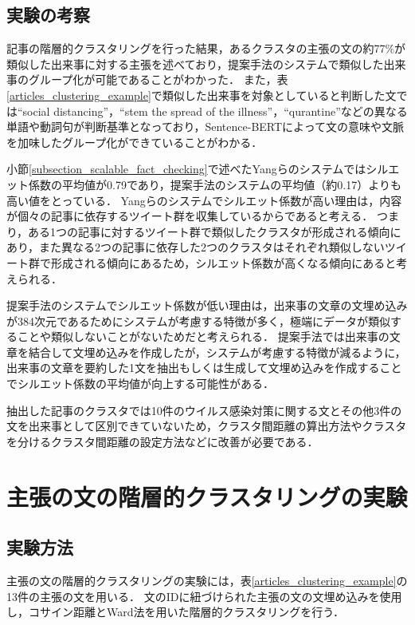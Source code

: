 \documentclass[12pt,a4j]{jreport}
\begin{document}
\subsection{実験の考察}
記事の階層的クラスタリングを行った結果，あるクラスタの主張の文の約77\%が類似した出来事に対する主張を述べており，提案手法のシステムで類似した出来事のグループ化が可能であることがわかった．
また，表\ref{articles_clustering_example}で類似した出来事を対象としていると判断した文では``social distancing''，``stem the spread of the illness''，``qurantine''などの異なる単語や動詞句が判断基準となっており，Sentence-BERTによって文の意味や文脈を加味したグループ化ができていることがわかる．

小節\ref{subsection_scalable_fact_checking}で述べたYangらのシステムではシルエット係数の平均値が0.79であり，提案手法のシステムの平均値（約0.17）よりも高い値をとっている\cite{yang_scalable_2021}．
Yangらのシステムでシルエット係数が高い理由は，内容が個々の記事に依存するツイート群を収集しているからであると考える．
つまり，ある1つの記事に対するツイート群で類似したクラスタが形成される傾向にあり，また異なる2つの記事に依存した2つのクラスタはそれぞれ類似しないツイート群で形成される傾向にあるため，シルエット係数が高くなる傾向にあると考えられる．

提案手法のシステムでシルエット係数が低い理由は，出来事の文章の文埋め込みが384次元であるためにシステムが考慮する特徴が多く，極端にデータが類似することや類似しないことがないためだと考えられる．
提案手法では出来事の文章を結合して文埋め込みを作成したが，システムが考慮する特徴が減るように，出来事の文章を要約した1文を抽出もしくは生成して文埋め込みを作成することでシルエット係数の平均値が向上する可能性がある．

抽出した記事のクラスタでは10件のウイルス感染対策に関する文とその他3件の文を出来事として区別できていないため，クラスタ間距離の算出方法やクラスタを分けるクラスタ間距離の設定方法などに改善が必要である．

\section{主張の文の階層的クラスタリングの実験}
\label{section_sentence_clustering_experiment}

\subsection{実験方法}
主張の文の階層的クラスタリングの実験には，表\ref{articles_clustering_example}の13件の主張の文を用いる．
文のIDに紐づけられた主張の文の文埋め込みを使用し，コサイン距離とWard法を用いた階層的クラスタリングを行う．
\end{document}
